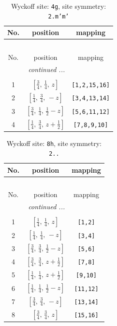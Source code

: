 \documentclass[fleqn,8pt]{jsarticle}
\begin{document}
\renewcommand{\arraystretch}{1.2}
\begin{longtable}{ccc}
\caption{Wyckoff site: {\tt 4g}, site symmetry: {\tt 2.m'm'}}
 \\
 \hline \hline
No. & position & mapping \\ \hline \endfirsthead

\multicolumn{2}{l}{\tablename\ \thetable{}} \\
 \hline \hline
No. & position & mapping \\ \hline \endhead

 \hline \hline
\multicolumn{2}{r}{\footnotesize\it continued ...} \\ \endfoot

 \hline \hline
\multicolumn{2}{r}{} \\ \endlastfoot

1 & $\left[ \frac{3}{4},\, \frac{1}{4},\, z \right]$ & {\tt [1,2,15,16]} \\ \hline
2 & $\left[ \frac{1}{4},\, \frac{3}{4},\, - z \right]$ & {\tt [3,4,13,14]} \\ \hline
3 & $\left[ \frac{3}{4},\, \frac{1}{4},\, \frac{1}{2} - z \right]$ & {\tt [5,6,11,12]} \\ \hline
4 & $\left[ \frac{1}{4},\, \frac{3}{4},\, z + \frac{1}{2} \right]$ & {\tt [7,8,9,10]} \\
\end{longtable}
\renewcommand{\arraystretch}{1.2}
\begin{longtable}{ccc}
\caption{Wyckoff site: {\tt 8h}, site symmetry: {\tt 2..}}
 \\
 \hline \hline
No. & position & mapping \\ \hline \endfirsthead

\multicolumn{2}{l}{\tablename\ \thetable{}} \\
 \hline \hline
No. & position & mapping \\ \hline \endhead

 \hline \hline
\multicolumn{2}{r}{\footnotesize\it continued ...} \\ \endfoot

 \hline \hline
\multicolumn{2}{r}{} \\ \endlastfoot

1 & $\left[ \frac{1}{4},\, \frac{1}{4},\, z \right]$ & {\tt [1,2]} \\ \hline
2 & $\left[ \frac{1}{4},\, \frac{1}{4},\, - z \right]$ & {\tt [3,4]} \\ \hline
3 & $\left[ \frac{3}{4},\, \frac{3}{4},\, \frac{1}{2} - z \right]$ & {\tt [5,6]} \\ \hline
4 & $\left[ \frac{3}{4},\, \frac{3}{4},\, z + \frac{1}{2} \right]$ & {\tt [7,8]} \\ \hline
5 & $\left[ \frac{1}{4},\, \frac{1}{4},\, z + \frac{1}{2} \right]$ & {\tt [9,10]} \\ \hline
6 & $\left[ \frac{1}{4},\, \frac{1}{4},\, \frac{1}{2} - z \right]$ & {\tt [11,12]} \\ \hline
7 & $\left[ \frac{3}{4},\, \frac{3}{4},\, - z \right]$ & {\tt [13,14]} \\ \hline
8 & $\left[ \frac{3}{4},\, \frac{3}{4},\, z \right]$ & {\tt [15,16]} \\
\end{longtable}
\end{document}

